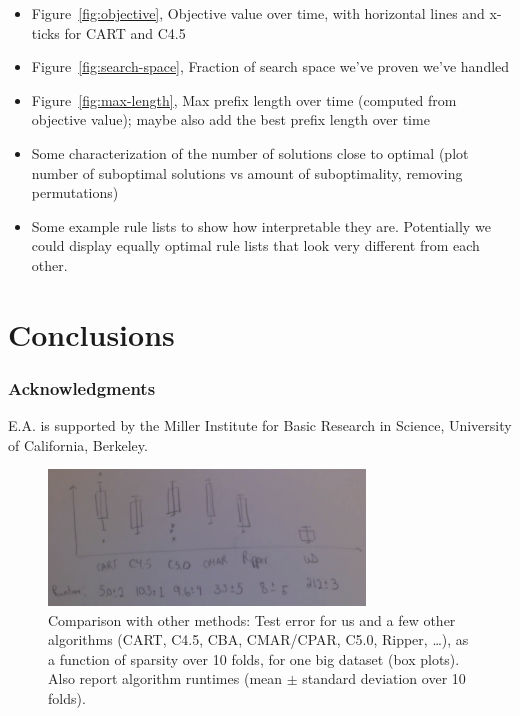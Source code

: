 \begin{itemize}
\item Figure~\ref{fig:objective}, Objective value over time,
with horizontal lines and x-ticks for CART and C4.5

\item Figure~\ref{fig:search-space},
Fraction of search space we've proven we've handled

\item Figure~\ref{fig:max-length},
Max prefix length over time (computed from objective value);
maybe also add the best prefix length over time

\item Some characterization of the number of solutions close to optimal
(plot number of suboptimal solutions vs amount of suboptimality,
removing permutations)

\item Some example rule lists to show how interpretable they are.
Potentially we could display equally optimal rule lists that look
very different from each other.

\end{itemize}

\section{Conclusions}

\subsubsection*{Acknowledgments}

E.A. is supported by the Miller Institute for Basic Research in Science,
University of California, Berkeley.




\begin{figure}[t!]
\begin{center}
\includegraphics[width=0.75\textwidth]{figs/sketch-comparison.png}
\end{center}
\caption{Comparison with other methods:
Test error for us and a few other algorithms
(CART, C4.5, CBA, CMAR/CPAR, C5.0, Ripper, \dots),
as a function of sparsity over 10 folds, for one big dataset (box plots).
Also report algorithm runtimes (mean $\pm$ standard deviation over 10 folds).}
\label{fig:comparison}
\end{figure}

